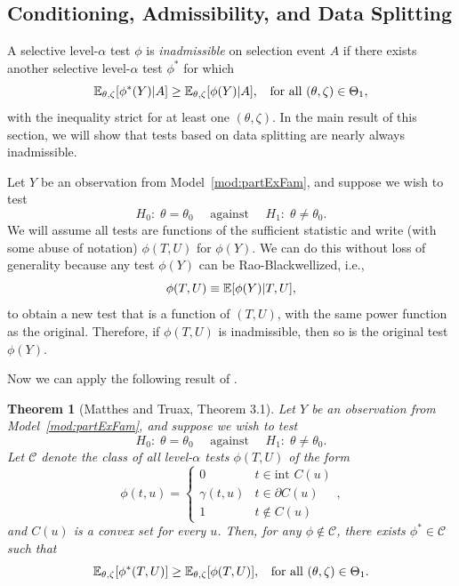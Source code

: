 \documentclass{article}
\newtheorem{theorem}{Theorem}
\theoremstyle{definition}
\newcommand{\sC}{\mathscr{C}}
\begin{document}
\subsection{Conditioning, Admissibility, and Data Splitting}\label{sec:admissibility}

A selective level-$\alpha$ test $\phi$ is {\em inadmissible} on selection event $A$ if there exists another selective level-$\alpha$ test $\phi^*$ for which
\begin{equation}
  \mathbb{E}_{\theta,\zeta}[\phi^*(Y) | A] \geq \mathbb{E}_{\theta,\zeta}[\phi(Y) | A], \;\;\text{ for all } (\theta,\zeta)\in \Theta_1,
\end{equation}
with the inequality strict for at least one $(\theta,\zeta)$. In the main result of this section, we will show that tests based on data splitting are nearly always inadmissible.

Let $Y$ be an observation from Model~\ref{mod:partExFam}, and suppose we wish to test
 \begin{equation}\label{eq:hypEq}
  H_0:\;\theta=\theta_0 \quad \text{ against }
  \quad H_1:\; \theta\neq \theta_0.
\end{equation}
We will assume all tests are functions of the sufficient statistic and write (with some abuse of notation) $\phi(T, U)$ for $\phi(Y)$. We can do this without loss of generality because any test $\phi(Y)$ can be Rao-Blackwellized, i.e.,
\[ \phi(T, U) \equiv \mathbb{E}[\phi(Y) | T, U], \]
to obtain a new test that is a function of $(T, U)$, with the same power function as the original. Therefore, if $\phi(T, U)$ is inadmissible, then so is the original test $\phi(Y)$.

Now we can apply the following result of \citet{matthes1967tests}.

\begin{theorem}[Matthes and Truax, Theorem 3.1]
Let $Y$ be an observation from Model~\ref{mod:partExFam}, and suppose we wish to test
 \begin{equation}\label{eq:hypEq}
  H_0:\;\theta=\theta_0 \quad \text{ against }
  \quad H_1:\; \theta\neq \theta_0.
\end{equation}
 Let $\sC$ denote the class of all level-$\alpha$ tests $\phi(T, U)$ of the form
 \begin{equation}\label{eq:convexU}
   \phi(t, u) = \begin{cases}
       0 & t \in \text{int } C(u) \\
       \gamma(t, u) & t \in \partial C(u)\\
       1 & t \notin C(u)
     \end{cases},
 \end{equation}
and $C(u)$ is a convex set for every $u$. Then, for any $\phi \notin \sC$, there exists $\phi^* \in \sC$ such that
\begin{equation}
  \mathbb{E}_{\theta,\zeta}[\phi^*(T, U)] \geq \mathbb{E}_{\theta,\zeta}[\phi(T, U)], \;\;\text{ for all } (\theta,\zeta)\in \Theta_1.
 \label{eq:inadmissible}
\end{equation}
\label{thm:matthes}
\end{theorem}
\end{document}
